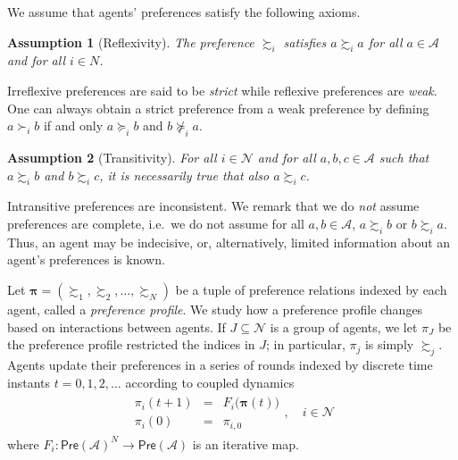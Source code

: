 \documentclass[conference]{ieeeconf}
\newcommand{\N}{\mathcal{N}}
\newcommand{\A}{\mathcal{A}}
\newcommand{\Pref}{\mathsf{Pre}}
\newcommand{\prefers}{\succsim}
\newcommand{\profile}{\boldsymbol{\pi}}
\newtheorem{assumption}{Assumption}
\begin{document}


We assume that agents' preferences satisfy the following axioms.
\begin{assumption}[Reflexivity] \label{ass:reflexivity}
    The preference $\prefers_i$ satisfies $a \prefers_i a$ for all $a \in \A$ and for all $i \in N$.
\end{assumption}

Irreflexive preferences are said to be \emph{strict} while reflexive preferences are \emph{weak}. One can always obtain a strict preference from a weak preference by defining $a \succ_i b$ if and only $a \succeq_i b$ and $b \not\succeq_i a$.

\begin{assumption}[Transitivity]\label{ass:transitivity}
    For all $i \in \N$ and for all $a, b, c \in \A$ such that $a \prefers_i b$ and $b \prefers_i c$, it is necessarily true that also $a \prefers_i c$.
\end{assumption}

Intransitive preferences are inconsistent. We remark that we do \emph{not} assume preferences are complete, i.e.~we do not assume for all $a,b \in \A$, $a \prefers_i b$ or $b \prefers_i a$. Thus, an agent may be indecisive, or, alternatively, limited information about an agent's preferences is known. 

Let $\profile = \left( \prefers_1, \prefers_2, \dots, \prefers_N \right)$ be a tuple of preference relations indexed by each agent, called a \emph{preference profile}. We study how a preference profile changes based on interactions between agents. If $J \subseteq \N$ is a group of agents, we let $\pi_{J}$ be the preference profile restricted the indices in $J$; in particular, $\pi_j$ is simply $\prefers_j$. Agents update their preferences in a series of rounds indexed by discrete time instants $t=0,1,2,\dots$ according to coupled dynamics
\begin{align}
    \begin{aligned}
        \pi_i(t+1) &=& F_i \bigl( \profile(t) \bigr)  \\
        \pi_i(0) &=& \pi_{i,0}
    \end{aligned}, \quad i \in \N
    \label{eq:pi-dynamics}
\end{align}
where $F_i: \Pref(\A)^N \to \Pref(\A)$ is an iterative map.
\end{document}
